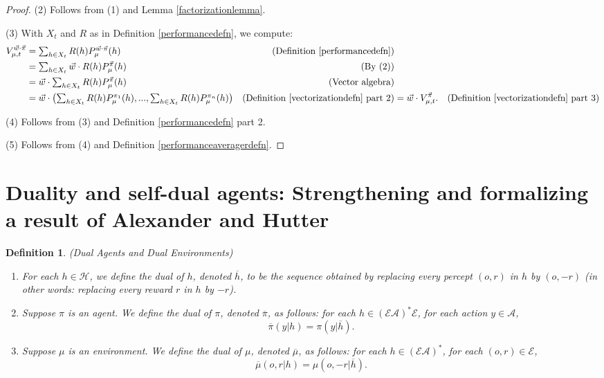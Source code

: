 \documentclass[twoside]{article}
\newtheorem{definition}[theorem]{Definition}
\begin{document}
\begin{proof}
    (2) Follows from (1) and Lemma \ref{factorizationlemma}.

    (3) With $X_t$ and $R$ as in Definition \ref{performancedefn}, we compute:
    \begin{align*}
        V^{\vec w\cdot\vec\pi}_{\mu,t}
            &= \mbox{$\sum_{h\in X_t}R(h)P^{\vec w\cdot\vec\pi}_\mu(h)$}
                &\mbox{(Definition \ref{performancedefn})}\\
            &= \mbox{$\sum_{h\in X_t}\vec w\cdot R(h)P^{\vec\pi}_\mu(h)$}
                &\mbox{(By (2))}\\
            &= \mbox{$\vec w\cdot \sum_{h\in X_t}R(h)P^{\vec\pi}_\mu(h)$}
                &\mbox{(Vector algebra)}\\
            &= \mbox{$\vec w\cdot
                \left(
                    \sum_{h\in X_t}R(h)P^{\pi_1}_\mu(h)
                    ,...,
                    \sum_{h\in X_t}R(h)P^{\pi_n}_\mu(h)
                \right)$}
                &\mbox{(Definition \ref{vectorizationdefn} part 2)}
            &= \vec w\cdot V^{\vec\pi}_{\mu,t}.
                &\mbox{(Definition \ref{vectorizationdefn} part 3)}
    \end{align*}

    (4) Follows from (3) and Definition \ref{performancedefn} part 2.

    (5) Follows from (4) and Definition \ref{performanceaveragerdefn}.
\end{proof}

\section{Duality and self-dual agents:
Strengthening and formalizing a result of Alexander and Hutter}

\begin{definition}
\label{dualagentsdefn}
(Dual Agents and Dual Environments)
\begin{enumerate}
    \item
    For each $h\in\mathcal H$,
    we define the \emph{dual} of $h$, denoted $\overline h$, to be
    the sequence obtained
    by replacing every percept $(o,r)$ in $h$ by $(o,-r)$ (in other words:
    replacing every reward $r$ in $h$ by $-r$).
    \item
    Suppose $\pi$ is an agent.
    We define the \emph{dual} of $\pi$, denoted $\overline \pi$, as follows:
    for each $h\in (\mathcal E\mathcal A)^*\mathcal E$,
    for each action $y\in\mathcal A$,
    \[\overline\pi(y|h)=\pi(y|\overline h).\]
    \item
    Suppose $\mu$ is an environment.
    We define the \emph{dual} of $\mu$, denoted $\overline\mu$, as follows:
    for each $h\in (\mathcal E\mathcal A)^*$,
    for each $(o,r)\in\mathcal E$,
    \[\overline\mu(o,r|h)=\mu(o,-r|\overline h).\]
\end{enumerate}
\end{definition}
\end{document}

